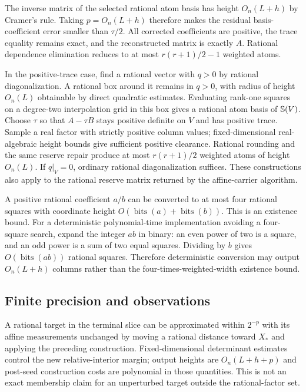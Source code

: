 The inverse matrix of the selected rational atom basis has height $O_n(L+h)$ by Cramer's rule. Taking $p=O_n(L+h)$ therefore makes the residual basis-coefficient error smaller than $\tau/2$. All corrected coefficients are positive, the trace equality remains exact, and the reconstructed matrix is exactly $A$. Rational dependence elimination reduces to at most $r(r+1)/2-1$ weighted atoms.

In the positive-trace case, find a rational vector with $q>0$ by rational diagonalization. A rational box around it remains in $q>0$, with radius of height $O_n(L)$ obtainable by direct quadratic estimates. Evaluating rank-one squares on a degree-two interpolation grid in this box gives a rational atom basis of $\mathbb S(V)$. Choose $\tau$ so that $A-\tau B$ stays positive definite on $V$ and has positive trace. Sample a real factor with strictly positive column values; fixed-dimensional real-algebraic height bounds give sufficient positive clearance. Rational rounding and the same reserve repair produce at most $r(r+1)/2$ weighted atoms of height $O_n(L)$. If $q|_V=0$, ordinary rational diagonalization suffices. These constructions also apply to the rational reserve matrix returned by the affine-carrier algorithm.

A positive rational coefficient $a/b$ can be converted to at most four rational squares with coordinate height $O(\operatorname{bits}(a)+\operatorname{bits}(b))$. This is an existence bound. For a deterministic polynomial-time implementation avoiding a four-square search, expand the integer $ab$ in binary: an even power of two is a square, and an odd power is a sum of two equal squares. Dividing by $b$ gives $O(\operatorname{bits}(ab))$ rational squares. Therefore deterministic conversion may output $O_n(L+h)$ columns rather than the four-times-weighted-width existence bound.

\subsection{Finite precision and observations}
A rational target in the terminal slice can be approximated within $2^{-p}$ with its affine measurements unchanged by moving a rational distance toward $X_*$ and applying the preceding construction. Fixed-dimensional determinant estimates control the new relative-interior margin; output heights are $O_n(L+h+p)$ and post-seed construction costs are polynomial in those quantities. This is not an exact membership claim for an unperturbed target outside the rational-factor set.

